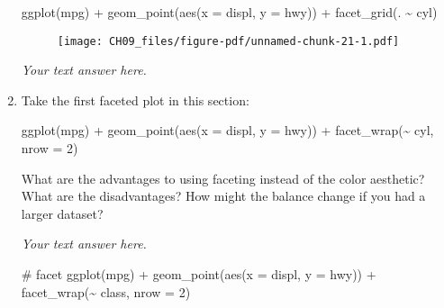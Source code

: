\documentclass[
  letterpaper,
  DIV=11,
  numbers=noendperiod]{scrreprt}
\newenvironment{Shaded}{\begin{snugshade}}{\end{snugshade}}
\newcommand{\AttributeTok}[1]{\textcolor[rgb]{0.40,0.45,0.13}{#1}}
\newcommand{\CommentTok}[1]{\textcolor[rgb]{0.37,0.37,0.37}{#1}}
\newcommand{\DecValTok}[1]{\textcolor[rgb]{0.68,0.00,0.00}{#1}}
\newcommand{\FunctionTok}[1]{\textcolor[rgb]{0.28,0.35,0.67}{#1}}
\newcommand{\NormalTok}[1]{\textcolor[rgb]{0.00,0.23,0.31}{#1}}
\newcommand{\SpecialCharTok}[1]{\textcolor[rgb]{0.37,0.37,0.37}{#1}}
\begin{document}
\begin{enumerate}
\begin{tcolorbox}
\begin{Shaded}
\begin{Highlighting}[]
\FunctionTok{ggplot}\NormalTok{(mpg) }\SpecialCharTok{+} 
  \FunctionTok{geom\_point}\NormalTok{(}\FunctionTok{aes}\NormalTok{(}\AttributeTok{x =}\NormalTok{ displ, }\AttributeTok{y =}\NormalTok{ hwy)) }\SpecialCharTok{+}
  \FunctionTok{facet\_grid}\NormalTok{(. }\SpecialCharTok{\textasciitilde{}}\NormalTok{ cyl)}
\end{Highlighting}
\end{Shaded}

  \begin{figure}[H]

  {\centering \texttt{[image: CH09\_files/figure-pdf/unnamed-chunk-21-1.pdf]}

  }

  \end{figure}

  \emph{Your text answer here.}

  \end{tcolorbox}
\item
  Take the first faceted plot in this section:

\begin{Shaded}
\begin{Highlighting}[]
\FunctionTok{ggplot}\NormalTok{(mpg) }\SpecialCharTok{+} 
  \FunctionTok{geom\_point}\NormalTok{(}\FunctionTok{aes}\NormalTok{(}\AttributeTok{x =}\NormalTok{ displ, }\AttributeTok{y =}\NormalTok{ hwy)) }\SpecialCharTok{+} 
  \FunctionTok{facet\_wrap}\NormalTok{(}\SpecialCharTok{\textasciitilde{}}\NormalTok{ cyl, }\AttributeTok{nrow =} \DecValTok{2}\NormalTok{)}
\end{Highlighting}
\end{Shaded}

  What are the advantages to using faceting instead of the color
  aesthetic? What are the disadvantages? How might the balance change if
  you had a larger dataset?

  \begin{tcolorbox}[enhanced jigsaw, left=2mm, rightrule=.15mm, bottomtitle=1mm, opacitybacktitle=0.6, leftrule=.75mm, opacityback=0, colframe=quarto-callout-note-color-frame, bottomrule=.15mm, coltitle=black, toptitle=1mm, colback=white, titlerule=0mm, colbacktitle=quarto-callout-note-color!10!white, title={Answer}, toprule=.15mm, breakable, arc=.35mm]

  \emph{Your text answer here.}

\begin{Shaded}
\begin{Highlighting}[]
\CommentTok{\# facet}
\FunctionTok{ggplot}\NormalTok{(mpg) }\SpecialCharTok{+} 
 \FunctionTok{geom\_point}\NormalTok{(}\FunctionTok{aes}\NormalTok{(}\AttributeTok{x =}\NormalTok{ displ, }\AttributeTok{y =}\NormalTok{ hwy)) }\SpecialCharTok{+} 
  \FunctionTok{facet\_wrap}\NormalTok{(}\SpecialCharTok{\textasciitilde{}}\NormalTok{ class, }\AttributeTok{nrow =} \DecValTok{2}\NormalTok{)}
\end{Highlighting}
\end{Shaded}


\end{tcolorbox}
\end{enumerate}
\end{document}
